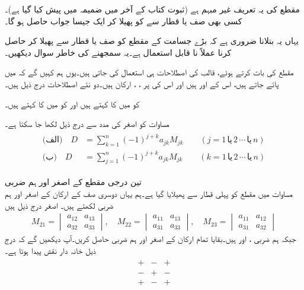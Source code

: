 مقطع کی یہ تعریف غیر مبہم ہے (ثبوت کتاب کے آخر میں ضمیمہ  میں پیش کیا گیا ہے)۔ کسی بھی صف یا قطار سے  کو پھیلا کر ایک جیسا جواب حاصل ہو گا۔

یہاں یہ بتلانا ضروری ہے کہ بڑے جسامت کے مقطع کو صف یا قطار سے پھیلا کر حاصل کرنا  عملاً نا قابل استعمال ہے۔یہ سمجھنے کی خاطر سوال  دیکھیں۔

مقطع کی بات کرتے ہوئے، قالب کی اصطلاحات ہی استعمال کی جاتی ہیں۔یوں ہم کہیں گے کہ  میں    پائے جاتے ہیں، اس کے   اور   ہیں اور اس کی  پر ، ،  ارکان ہیں۔دو نئے اصطلاحات درج ذیل ہیں۔

 کو  میں  کا  کہتے ہیں اور  کو  میں  کا  کہتے ہیں۔

مساوات  کو اصغر کی مدد سے درج ذیل لکھا جا سکتا ہے۔
\begin{gather}
\begin{aligned}\label{مساوات_الجبرا_مقطع_مجموعہ}
\text{(الف)}\quad D&=\sum_{k=1}^{n} (-1)^{j+k}a_{jk}M_{jk}\quad \quad (j=1\,\text{یا}\, 2\,\cdots \,\text{یا}\, n)\\
\text{(ب)}\quad D&=\sum_{j=1}^{n} (-1)^{j+k}a_{jk}M_{jk}\quad \quad (k=1\,\text{یا}\, 2\,\cdots \,\text{یا}\, n)
\end{aligned}
\end{gather}

\quad تین درجی مقطع کے اصغر اور ہم ضربی\\
مساوات  میں مقطع کو پہلی قطار سے پھیلایا گیا ہے۔ہم یہاں دوسری صف کے ارکان کے اصغر اور ہم ضربی لکھتے ہیں۔ اصغر درج ذیل ہیں
\begin{align*}
M_{21}=
\begin{vmatrix}
a_{12}&a_{13}\\a_{32}&a_{33}
\end{vmatrix},\quad
M_{22}=
\begin{vmatrix}
a_{11}&a_{13}\\a_{31}&a_{33}
\end{vmatrix},\quad
M_{23}=
\begin{vmatrix}
a_{11}&a_{12}\\a_{31}&a_{32}
\end{vmatrix}
\end{align*}  
جبکہ ہم ضربی ،  اور  ہیں۔بقایا تمام ارکان کے اصغر اور ہم ضربی حاصل کریں۔آپ دیکھیں گے کہ  درج ذیل خانہ دار نقش پیدا ہوتا ہے۔
\begin{align*}
\begin{matrix}
+&-&+\\
-&+&-\\
+&-&+
\end{matrix}
\end{align*}

